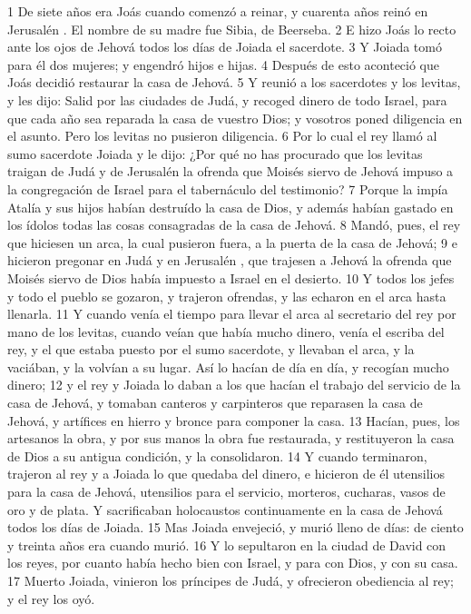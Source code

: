 1 De siete años era Joás cuando comenzó a reinar, y cuarenta años reinó en Jerusalén . El nombre de su madre fue Sibia, de Beerseba.
2 E hizo Joás lo recto ante los ojos de Jehová todos los días de Joiada el sacerdote.
3 Y Joiada tomó para él dos mujeres; y engendró hijos e hijas.
4 Después de esto aconteció que Joás decidió restaurar la casa de Jehová.
5 Y reunió a los sacerdotes y los levitas, y les dijo: Salid por las ciudades de Judá, y recoged dinero de todo Israel, para que cada año sea reparada la casa de vuestro Dios; y vosotros poned diligencia en el asunto. Pero los levitas no pusieron diligencia.
6 Por lo cual el rey llamó al sumo sacerdote Joiada y le dijo: ¿Por qué no has procurado que los levitas traigan de Judá y de Jerusalén la ofrenda que Moisés siervo de Jehová  impuso a la congregación de Israel para el tabernáculo del testimonio? 
7 Porque la impía Atalía y sus hijos habían destruído la casa de Dios, y además habían gastado en los ídolos todas las cosas consagradas de la casa de Jehová.
8 Mandó, pues, el rey que hiciesen un arca, la cual pusieron fuera, a la puerta de la casa de Jehová;
9 e hicieron pregonar en Judá y en Jerusalén , que trajesen a Jehová la ofrenda que Moisés siervo de Dios había impuesto a Israel en el desierto.
10 Y todos los jefes y todo el pueblo se gozaron, y trajeron ofrendas, y las echaron en el arca hasta llenarla.
11 Y cuando venía el tiempo para llevar el arca al secretario del rey por mano de los levitas, cuando veían que había mucho dinero, venía el escriba del rey, y el que estaba puesto por el sumo sacerdote, y llevaban el arca, y la vaciában, y la volvían a su lugar. Así lo hacían de día en día, y recogían mucho dinero;
12 y el rey y Joiada lo daban a los que hacían el trabajo del servicio de la casa de Jehová, y tomaban canteros y carpinteros que reparasen la casa de Jehová, y artífices en hierro y bronce para componer la casa.
13 Hacían, pues, los artesanos la obra, y por sus manos la obra fue restaurada, y restituyeron la casa de Dios a su antigua condición, y la consolidaron.
14 Y cuando terminaron, trajeron al rey y a Joiada lo que quedaba del dinero, e hicieron de él utensilios para la casa de Jehová, utensilios para el servicio, morteros, cucharas, vasos de oro y de plata. Y sacrificaban holocaustos continuamente en la casa de Jehová todos los días de Joiada.
15 Mas Joiada envejeció, y murió lleno de días: de ciento y treinta años era cuando murió.
16 Y lo sepultaron en la ciudad de David con los reyes, por cuanto había hecho bien con Israel, y para con Dios, y con su casa.
17 Muerto Joiada, vinieron los príncipes de Judá, y ofrecieron obediencia al rey;  y el rey los oyó.
